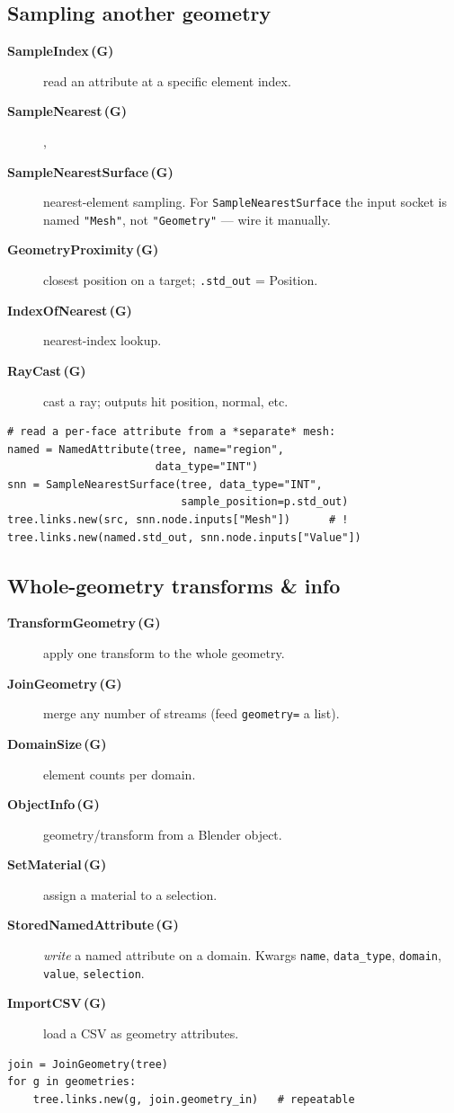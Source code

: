 \documentclass[10pt,a4paper,twocolumn]{article}
\newcommand{\code}[1]{\texttt{\small #1}}
\newcommand{\Gn}{\textcolor{greennode}{\textbf{(G)}}}
\newcommand{\cls}[3]{\item[\textbf{#1}\,#2] #3}
\begin{document}
\subsection{Sampling another geometry}
\begin{description}
\cls{SampleIndex}{\Gn}{read an attribute at a specific element index.}
\cls{SampleNearest}{\Gn}, \cls{SampleNearestSurface}{\Gn}{nearest-element
  sampling. For \code{SampleNearestSurface} the input socket is named
  \code{"Mesh"}, not \code{"Geometry"} --- wire it manually.}
\cls{GeometryProximity}{\Gn}{closest position on a target;
  \code{.std\_out} = Position.}
\cls{IndexOfNearest}{\Gn}{nearest-index lookup.}
\cls{RayCast}{\Gn}{cast a ray; outputs hit position, normal, etc.}
\end{description}

\begin{lstlisting}
# read a per-face attribute from a *separate* mesh:
named = NamedAttribute(tree, name="region",
                       data_type="INT")
snn = SampleNearestSurface(tree, data_type="INT",
                           sample_position=p.std_out)
tree.links.new(src, snn.node.inputs["Mesh"])      # !
tree.links.new(named.std_out, snn.node.inputs["Value"])
\end{lstlisting}

\subsection{Whole-geometry transforms \& info}
\begin{description}
\cls{TransformGeometry}{\Gn}{apply one transform to the whole geometry.}
\cls{JoinGeometry}{\Gn}{merge any number of streams (feed
  \code{geometry=} a list).}
\cls{DomainSize}{\Gn}{element counts per domain.}
\cls{ObjectInfo}{\Gn}{geometry/transform from a Blender object.}
\cls{SetMaterial}{\Gn}{assign a material to a selection.}
\cls{StoredNamedAttribute}{\Gn}{\emph{write} a named attribute on a
  domain. Kwargs \code{name}, \code{data\_type}, \code{domain},
  \code{value}, \code{selection}.}
\cls{ImportCSV}{\Gn}{load a CSV as geometry attributes.}
\end{description}

\begin{lstlisting}
join = JoinGeometry(tree)
for g in geometries:
    tree.links.new(g, join.geometry_in)   # repeatable
\end{lstlisting}

\end{document}
